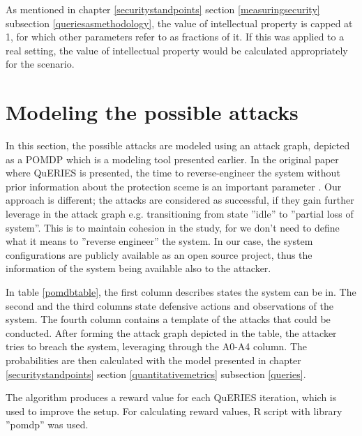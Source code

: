 As mentioned in chapter \ref{securitystandpoints} section
\ref{measuringsecurity} subsection \ref{queriesasmethodology}, the
value of intellectual property is capped at 1, for which other
parameters refer to as fractions of it. If this was applied to a real
setting, the value of intellectual property would be calculated
appropriately for the scenario.

\section{Modeling the possible attacks}

In this section, the possible attacks are modeled using an attack
graph, depicted as a POMDP which is a modeling tool presented
earlier. In the original paper where QuERIES is presented, the time to
reverse-engineer the system without prior information about the
protection sceme is an important parameter
\cite{carin2008cybersecurity}. Our approach is different; the attacks
are considered as successful, if they gain further leverage in the
attack graph e.g. transitioning from state ''idle'' to ''partial loss of
system''. This is to maintain cohesion in the study, for we don't need
to define what it means to ''reverse engineer'' the system. In our
case, the system configurations are publicly available as an open source
project, thus the information of the system being available also to
the attacker.

In table \ref{pomdbtable}, the first column describes states the
system can be in. The second and the third columns state defensive
actions and observations of the system. The fourth column contains a
template of the attacks that could be conducted. After forming the
attack graph depicted in the table, the attacker tries to breach the
system, leveraging through the A0-A4 column. The probabilities are
then calculated with the model presented in chapter
\ref{securitystandpoints} section \ref{quantitativemetrics} subsection
\ref{queries}.

The algorithm produces a reward value for each QuERIES iteration,
which is used to improve the setup. For calculating reward values, R
script with library ''pomdp'' was used.

